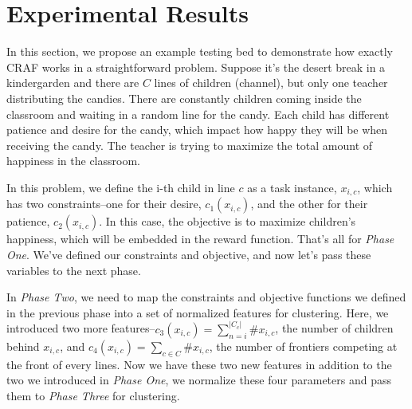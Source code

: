 \documentclass[conference]{IEEEtran}
\begin{document}



\section{Experimental Results}

In this section, we propose an example testing bed to demonstrate how exactly CRAF works in a straightforward problem. Suppose it's the desert break in a kindergarden and there are $C$ lines of children (channel), but only one teacher distributing the candies. There are constantly children coming inside the classroom and waiting in a random line for the candy. Each child has different patience and desire for the candy, which impact how happy they will be when receiving the candy. The teacher is trying to maximize the total amount of happiness in the classroom.

In this problem, we define the i-th child in line $c$ as a task instance, $x_{i,c}$, which has two constraints--one for their desire, $c_1(x_{i,c})$, and the other for their patience, $c_2(x_{i,c})$. In this case, the objective is to maximize children's happiness, which will be embedded in the reward function. That's all for \emph{Phase One}. We've defined our constraints and objective, and now let's pass these variables to the next phase.

In \emph{Phase Two}, we need to map the constraints and objective functions we defined in the previous phase into a set of normalized features for clustering. Here, we introduced two more features--$c_3(x_{i,c}) = \sum_{n = i}^{|C_c|}\#x_{i,c}$, the number of children behind $x_{i,c}$, and $c_4(x_{i,c}) = \sum_{c \in C}\#x_{i,c}$, the number of frontiers competing at the front of every lines. Now we have these two new features in addition to the two we introduced in \emph{Phase One}, we normalize these four parameters and pass them to \emph{Phase Three} for clustering.
\end{document}
